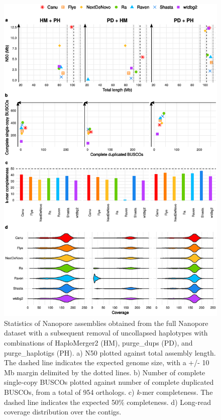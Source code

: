\begin{suppsection}
   \begin{figure}[ht]
    \centering
     \includegraphics[width=13.5cm]{fig/benchmark/supp_nanopore_purging_combinations_v20200919.eps}
   \caption{Statistics of Nanopore assemblies obtained from the full Nanopore dataset with a subsequent removal of uncollapsed haplotypes with combinations of HaploMerger2 (HM), purge\_dups (PD), and purge\_haplotigs (PH). a) N50 plotted against total assembly length. The dashed line indicates the expected genome size, with a +/- 10 Mb margin delimited by the dotted lines. b) Number of complete single-copy BUSCOs plotted against number of complete duplicated BUSCOs, from a total of 954 orthologs. c) \textit{k}-mer completeness. The dashed line indicates the expected 50\% completeness. d) Long-read coverage distribution over the contigs.}
   \label{fig:nanopore_purging_combinations}
 \end{figure}
 

\end{suppsection}
